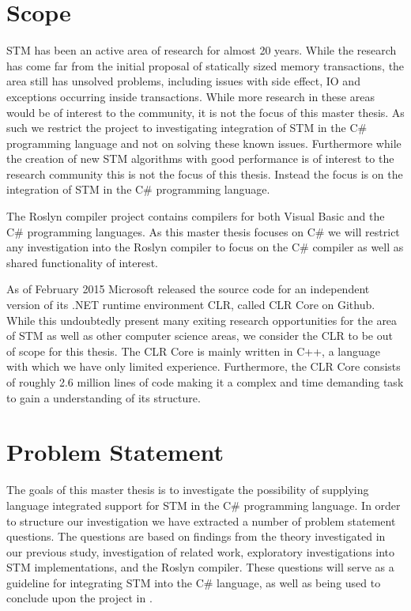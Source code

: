 \section{Scope}
\ac{STM} has been an active area of research for almost 20 years\cite{shavit1997software}. While the research has come far from the initial proposal of statically sized memory transactions, the area still has unsolved problems, including issues with side effect, \ac{IO} and exceptions occurring inside transactions\cite{harris2005exceptions}. While more research in these areas would be of interest to the community, it is not the focus of this master thesis. As such we restrict the project to investigating integration of \ac{STM} in the C\# programming language and not on solving these known issues. Furthermore while the creation of new \ac{STM} algorithms with good performance is of interest to the research community this is not the focus of this thesis. Instead  the focus is on the integration of \ac{STM} in the C\# programming language.

The Roslyn compiler project contains compilers for both Visual Basic and the C\# programming languages\cite{roslyn}. As this master thesis focuses on C\# we will restrict any investigation into the Roslyn compiler to focus on the C\# compiler as well as shared functionality of interest. 

As of February 2015 Microsoft released the source code for an independent version of its .NET runtime environment \acl{CLR}, called \ac{CLR} Core on Github\cite{coreclr}. While this undoubtedly present many exiting research opportunities for the area of \ac{STM} as well as other computer science areas, we consider the \ac{CLR} to be out of scope for this thesis. The \ac{CLR} Core is mainly written in C++\cite{coreclr}, a language with which we have only limited experience. Furthermore, the \ac{CLR} Core consists of roughly 2.6 million lines of code\cite{coreclrBlog} making it a complex and time demanding task to gain a understanding of its structure.

\section{Problem Statement}
The goals of this master thesis is to investigate the possibility of supplying language integrated support for \ac{STM} in the C\# programming language. In order to structure our investigation we have extracted a number of problem statement questions. The questions are based on findings from the theory investigated in our previous study, investigation of related work, exploratory investigations into \ac{STM} implementations, and the Roslyn compiler. These questions will serve as a guideline for integrating \ac{STM} into the C\# language, as well as being used to conclude upon the project in .

